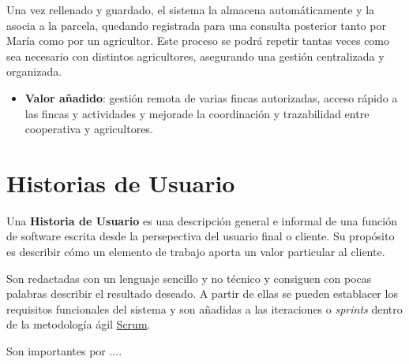 \begin{itemize}
    Una vez rellenado y guardado, el sistema la almacena automáticamente y la asocia a la parcela, quedando registrada para una
    consulta posterior tanto por María como por un agricultor. Este proceso se podrá repetir tantas veces como sea necesario con 
    distintos agricultores, asegurando una gestión centralizada y organizada.

    \begin{itemize}
        \item \textbf{Valor añadido}: gestión remota de varias fincas autorizadas, acceso rápido a las fincas y actividades y
        mejorade la coordinación y trazabilidad entre cooperativa y agricultores. 
    \end{itemize}
\end{itemize}

\section{Historias de Usuario}

Una \textbf{Historia de Usuario} \cite{historiaUsuario} es una descripción general e informal de una función de software escrita 
desde la persepectiva del usuario final o cliente. Su propósito es describir cómo un elemento de trabajo aporta un valor 
particular al cliente.

Son redactadas con un lenguaje sencillo y no técnico y consiguen con pocas palabras describir el resultado deseado. A partir de 
ellas se pueden establacer los requisitos funcionales del sistema y son añadidas a las iteraciones o \textit{sprints} dentro de 
la metodología ágil \hyperlink{scrum}{Scrum}.

Son importantes por ....